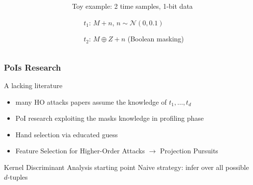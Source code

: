 \begin{frame}
{\begin{columns}
\begin{column}{.5\textwidth}
\end{column}
\begin{column}{.5\textwidth}
\begin{block}{}
Toy example: 2 time samples, 1-bit data
\begin{itemize}
\item[$t_1$:] $M + n$, $n\sim \mathcal{N}(0,0.1)$ 
\item[$t_2$:] $M\oplus Z + n$ (Boolean masking)
\end{itemize}
\end{block}
\end{column}
\end{columns}
}

\end{frame}



%

\begin{frame}
\frametitle{PoIs Research}

\begin{block}{A lacking literature}
\begin{itemize}
\item many HO attacks papers assume the knowledge of $t_1,\dots, t_d$
\item PoI research exploiting the masks knowledge in profiling phase
\item Hand selection via educated guess \cite{Oswald2006}
\item Feature Selection for Higher-Order Attacks $\longrightarrow$ Projection Pursuits \cite{PP}
\end{itemize}
\end{block}

\begin{block}{Kernel Discriminant Analysis starting point}
Naive strategy: infer over all possible $d$-tuples 
\end{block}
\end{frame}

